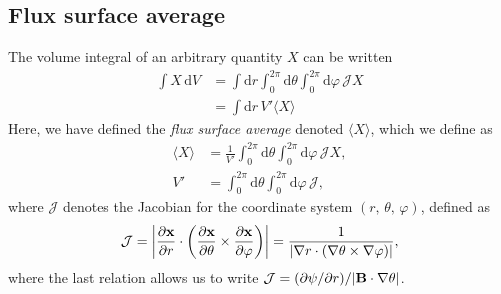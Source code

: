 \documentclass[11pt,a4paper]{article}
\newcommand{\rd}{\ensuremath{\mathrm{d}}}
\renewcommand{\b}[1]{\ensuremath{ {\bf #1 } }}
\begin{document}
\subsection{Flux surface average}
The volume integral of an arbitrary quantity $X$ can be written
\begin{align}
\int X \,\rd V &= \int\rd r  \int_0^{2\pi}\rd\theta \int_0^{2\pi}\rd \varphi \,\mathcal{J}X \nonumber \\
&= \int \rd r \, V'\langle X \rangle
\end{align}
Here, we have defined the \emph{flux surface average} denoted $\langle X \rangle$, which we define as
\begin{align}
\langle X \rangle &= \frac{1}{V'} \int_0^{2\pi}\rd \theta \int_0^{2\pi}\rd \varphi \, \mathcal{J}X, \nonumber \\
V' &= \int_0^{2\pi}\rd \theta \int_0^{2\pi}\rd \varphi  \, \mathcal{J},
\end{align}
where $\mathcal{J}$ denotes the Jacobian for the coordinate system $(r,\,\theta,\,\varphi)$, defined as
\begin{align}
\mathcal{J} =\left| \frac{\partial \b{x}}{\partial r}\cdot \left( \frac{\partial \b{x}}{\partial \theta}\times \frac{\partial\b{x}}{\partial \varphi}\right)\right| = \frac{1}{|\nabla r \cdot(\nabla \theta \times \nabla \varphi)|},
\end{align}
where the last relation allows us to write $\mathcal{J} = (\partial \psi/\partial r) /|\b{B}\cdot\nabla \theta|$.
\end{document}
